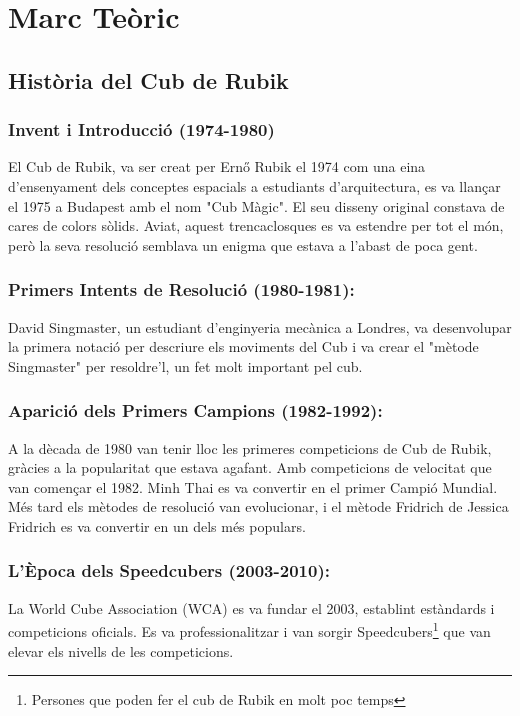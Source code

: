\pagestyle{normal}
\part{Marc Teòric}
\chapter{Història del Cub de Rubik}

\section{Invent i Introducció (1974-1980)}

El Cub de Rubik, va ser creat per Ernő Rubik el 1974 com una eina d'ensenyament dels conceptes espacials a estudiants d'arquitectura, es va llançar el 1975 a Budapest amb el nom "Cub Màgic". El seu disseny original constava de cares de colors sòlids. Aviat, aquest trencaclosques es va estendre per tot el món, però la seva resolució semblava un enigma que estava a l'abast de poca gent. \cite{Insider} \cite{ross_rubiks}

\section{Primers Intents de Resolució (1980-1981):}

David Singmaster, un estudiant d'enginyeria mecànica a Londres, va desenvolupar la primera notació per descriure els moviments del Cub i va crear el "mètode Singmaster" per resoldre'l, un fet molt important pel cub. \cite{DavidSingmaster}

\section{Aparició dels Primers Campions (1982-1992):}

A la dècada de 1980 van tenir lloc les primeres competicions de Cub de Rubik, gràcies a la popularitat que estava agafant. Amb competicions de velocitat que van començar el 1982. Minh Thai es va convertir en el primer Campió Mundial. Més tard els mètodes de resolució van evolucionar, i el mètode Fridrich de Jessica Fridrich es va convertir en un dels més populars.

\section{L'Època dels Speedcubers (2003-2010):}

La World Cube Association (WCA) es va fundar el 2003, establint estàndards i competicions oficials. Es va professionalitzar i van sorgir Speedcubers\footnote{Persones que poden fer el cub de Rubik en molt poc temps} que van elevar els nivells de les competicions.

